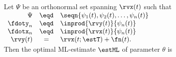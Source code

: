 \begin{theorem}
\label{thm:estML_general}
\label{thm:ml_est_det}
Let $\Psi$ be an orthonormal set spanning $\rvx(t)$ such that
\\\indentx$\begin{array}{rcl}
    \Psi     &\eqd& \seqn{\psi_1(t), \psi_2(t), \ldots, \psi_n(t)}
  \\\fdoty_n &\eqd& \inprod{\rvy(t)}{\psi_n(t)}
  \\\fdotx_n &\eqd& \inprod{\rvx(t)}{\psi_n(t)}
  \\\rvy(t)  &=   & \rvx(t;\estT) + \fn(t).
\end{array}$
\\
Then the optimal ML-estimate $\estML$ of parameter $\theta$ is
\end{theorem}
